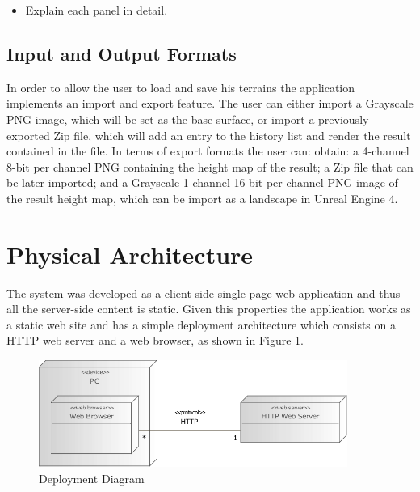       \begin{itemize}
      	\item Explain each panel in detail.
      \end{itemize}
    
    \subsection {Input and Output Formats}
    
      In order to allow the user to load and save his terrains the application implements an import and export feature. The user can either import a Grayscale PNG image, which will be set as the base surface, or import a previously exported Zip file, which will add an entry to the history list and render the result contained in the file. In terms of export formats the user can: obtain: a 4-channel 8-bit per channel PNG containing the height map of the result; a Zip file that can be later imported; and a Grayscale 1-channel 16-bit per channel PNG image of the result height map, which can be import as a landscape in Unreal Engine 4.

  \section {Physical Architecture} %
    
    The system was developed as a client-side single page web application and thus all the server-side content is static. Given this properties the application works as a static web site and has a simple deployment architecture which consists on a HTTP web server and a web browser, as shown in Figure \ref{fig:deployment_diagram}.
    
    \begin{figure}[h!]
    	\begin{center}
    		\includegraphics[width=0.9\textwidth]{images/diagrams/deployment.pdf}
    	\end{center}
    	\caption{Deployment Diagram}
    	\label{fig:deployment_diagram}
    \end{figure}
    
